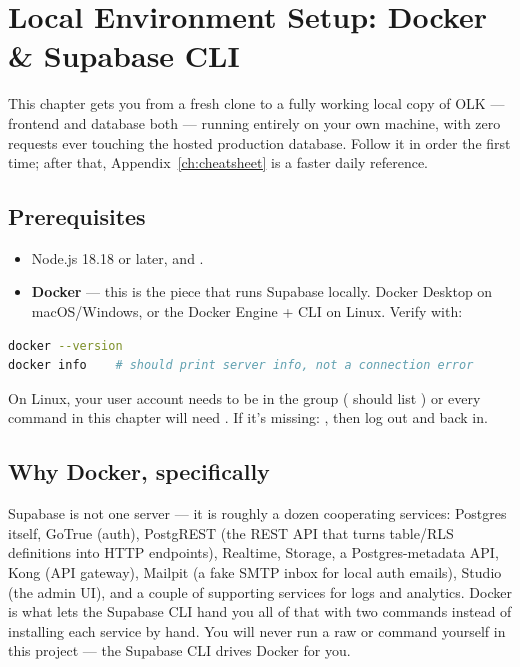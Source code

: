 \chapter{Local Environment Setup: Docker \& Supabase CLI}
\label{ch:local-env}

This chapter gets you from a fresh clone to a fully working local copy of OLK — frontend and database both — running entirely on your own machine, with zero requests ever touching the hosted production database. Follow it in order the first time; after that, Appendix~\ref{ch:cheatsheet} is a faster daily reference.

\section{Prerequisites}

\begin{itemize}
  \item Node.js 18.18 or later, and .
  \item \textbf{Docker} — this is the piece that runs Supabase locally. Docker Desktop on macOS/Windows, or the Docker Engine + CLI on Linux. Verify with:
\end{itemize}

\begin{lstlisting}[style=olkcodebash, language=bash, caption={Verifying Docker is installed and the daemon is reachable}]
docker --version
docker info    # should print server info, not a connection error
\end{lstlisting}

\begin{olkwarn}
On Linux, your user account needs to be in the  group ( should list ) or every command in this chapter will need . If it's missing: , then log out and back in.
\end{olkwarn}

\section{Why Docker, specifically}

Supabase is not one server — it is roughly a dozen cooperating services: Postgres itself, GoTrue (auth), PostgREST (the REST API that turns table/RLS definitions into HTTP endpoints), Realtime, Storage, a Postgres-metadata API, Kong (API gateway), Mailpit (a fake SMTP inbox for local auth emails), Studio (the admin UI), and a couple of supporting services for logs and analytics. Docker is what lets the Supabase CLI hand you all of that with two commands instead of installing each service by hand. You will never run a raw  or  command yourself in this project — the Supabase CLI drives Docker for you.

